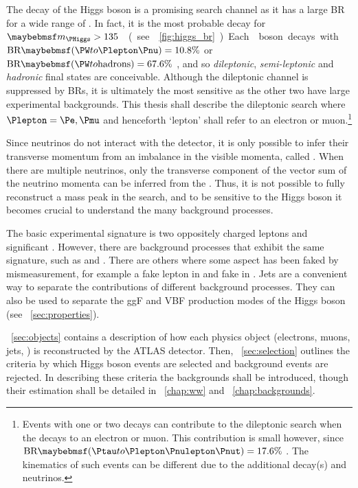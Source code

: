 
The \WW decay of the Higgs boson is a promising search channel as it has a large \ac{BR} 
for a wide range of \mH. In fact, it is the most probable decay for \unit{$\mH > 
135$}{\GeV} (see \Figure~\ref{fig:higgs_br}). Each \PW boson decays with 
$\text{BR}\parenths{\HepProcess{\PW\HepTo\Plepton\Pnu}} = 10.8\%$ 
or $\text{BR}\parenths{\HepProcess{\PW\HepTo \text{hadrons}}} = 67.6\%$ \cite{PDG:2012}, 
and so \textit{dileptonic}, \textit{semi-leptonic} and \textit{hadronic} final states are 
conceivable. Although the dileptonic channel is suppressed by \acp{BR}, it is ultimately 
the most sensitive as the other two have large experimental backgrounds. This thesis shall 
describe the dileptonic search \HWWlvlv where $\Plepton = \Pe, \Pmu$ and henceforth 
`lepton' shall refer to an electron or muon.\footnote{
	Events with one or two \HepProcess{\PW\HepTo\Ptau\Pnu} decays can 
	contribute to the dileptonic search when the \Ptau decays to an electron or muon. This 
	contribution is small however, since
	$\text{BR}\parenths{\HepProcess{\Ptau\HepTo\Plepton\Pnulepton\Pnut}} = 17.6\%$ 
	\cite{PDG:2012}. The kinematics of such events can be different due to the additional 
	decay(s) and neutrinos.
}

Since neutrinos do not interact with the detector, it is only possible to infer their 
transverse momentum from an imbalance in the visible momenta, called \met. When there are 
multiple neutrinos, only the transverse component of the vector sum of the neutrino 
momenta can be inferred from the \met. Thus, it is not possible to fully reconstruct a 
mass peak in the \HWWlvlv search, and to be sensitive to the Higgs boson it becomes 
crucial to understand the many background processes.

The basic experimental signature is two oppositely charged leptons and significant \met. 
However, there are background processes that exhibit the same signature, such as \WW and 
\ttbar. There are others where some aspect has been faked by mismeasurement, for example a 
fake lepton in \Wjets and fake \met in \Zjets. Jets are a convenient way to separate the 
contributions of different background processes. They can also be used to separate the 
\ac{ggF} and \ac{VBF} production modes of the Higgs boson (see 
\Section~\ref{sec:properties}).

\Section~\ref{sec:objects} contains a description of how each physics object (electrons, 
muons, jets, \met) is reconstructed by the ATLAS detector. Then, 
\Section~\ref{sec:selection} outlines the criteria by which Higgs boson events are 
selected and background events are rejected. In describing these criteria the backgrounds 
shall be introduced, though their estimation shall be detailed in \Chapter~\ref{chap:ww} 
and \Chapter~\ref{chap:backgrounds}.
